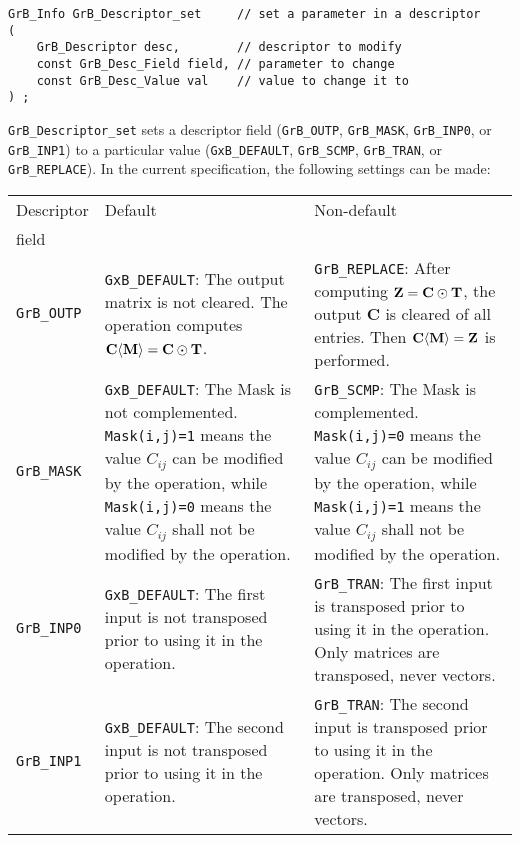 \documentclass[12pt]{article}
\begin{document}
\begin{mdframed}[userdefinedwidth=6in]
{\footnotesize
\begin{verbatim}
GrB_Info GrB_Descriptor_set     // set a parameter in a descriptor
(
    GrB_Descriptor desc,        // descriptor to modify
    const GrB_Desc_Field field, // parameter to change
    const GrB_Desc_Value val    // value to change it to
) ;
\end{verbatim} } \end{mdframed}

\verb'GrB_Descriptor_set' sets a descriptor field (\verb'GrB_OUTP',
\verb'GrB_MASK', \verb'GrB_INP0', or \verb'GrB_INP1') to a particular value
(\verb'GxB_DEFAULT', \verb'GrB_SCMP', \verb'GrB_TRAN', or \verb'GrB_REPLACE').
In the current specification, the following settings can be made:

\vspace{0.2in}
\noindent
{\small
\begin{tabular}{l|p{2.4in}|p{2.2in}}
Descriptor & Default   & Non-default \\
field      & &  \\
\hline

\verb'GrB_OUTP'
    & \verb'GxB_DEFAULT':
    The output matrix is not cleared.  The operation computes
    ${\bf C \langle M \rangle = C \odot T}$.
    & \verb'GrB_REPLACE':
    After computing ${\bf Z=C\odot T}$,
    the output {\bf C} is cleared of all entries.
    Then ${\bf C \langle M \rangle = Z}$ is performed. \\
\hline
\verb'GrB_MASK'
    & \verb'GxB_DEFAULT':
    The Mask is not complemented.  \verb'Mask(i,j)=1' means the value $C_{ij}$
    can be modified by the operation, while \verb'Mask(i,j)=0' means the value
    $C_{ij}$ shall not be modified by the operation.
    & \verb'GrB_SCMP':
    The Mask is complemented.  \verb'Mask(i,j)=0' means the value $C_{ij}$
    can be modified by the operation, while \verb'Mask(i,j)=1' means the value
    $C_{ij}$ shall not be modified by the operation. \\
\hline

\verb'GrB_INP0'
    & \verb'GxB_DEFAULT':
    The first input is not transposed prior to using it in the operation.
    & \verb'GrB_TRAN':
    The first input is transposed prior to using it in the operation.  Only
    matrices are transposed, never vectors. \\

\hline
\verb'GrB_INP1'
    & \verb'GxB_DEFAULT':
    The second input is not transposed prior to using it in the operation.
    & \verb'GrB_TRAN':
    The second input is transposed prior to using it in the operation.  Only
    matrices are transposed, never vectors. \\
\end{tabular}
}
\end{document}
